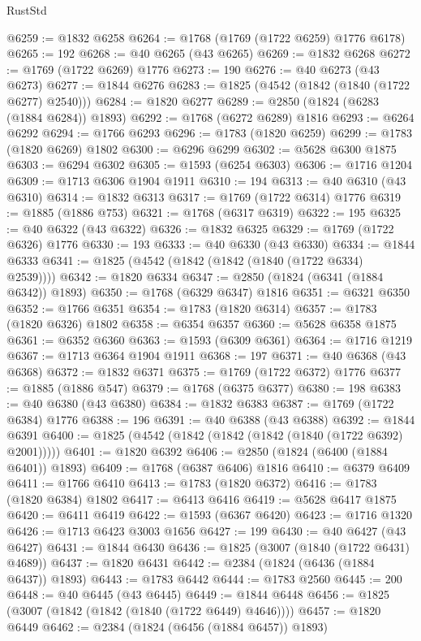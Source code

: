 \begin{lexlean}{RustStd}
\begin{coremodule}
@6259 := @1832 @6258
@6264 := @1768 (@1769 (@1722 @6259) @1776 @6178)
@6265 := 192
@6268 := @40 @6265 (@43 @6265)
@6269 := @1832 @6268
@6272 := @1769 (@1722 @6269) @1776
@6273 := 190
@6276 := @40 @6273 (@43 @6273)
@6277 := @1844 @6276
@6283 := @1825 (@4542 (@1842 (@1840 (@1722 @6277) @2540)))
@6284 := @1820 @6277
@6289 := @2850 (@1824 (@6283 (@1884 @6284)) @1893)
@6292 := @1768 (@6272 @6289) @1816
@6293 := @6264 @6292
@6294 := @1766 @6293
@6296 := @1783 (@1820 @6259)
@6299 := @1783 (@1820 @6269) @1802
@6300 := @6296 @6299
@6302 := @5628 @6300 @1875
@6303 := @6294 @6302
@6305 := @1593 (@6254 @6303)
@6306 := @1716 @1204
@6309 := @1713 @6306 @1904 @1911
@6310 := 194
@6313 := @40 @6310 (@43 @6310)
@6314 := @1832 @6313
@6317 := @1769 (@1722 @6314) @1776
@6319 := @1885 (@1886 @753)
@6321 := @1768 (@6317 @6319)
@6322 := 195
@6325 := @40 @6322 (@43 @6322)
@6326 := @1832 @6325
@6329 := @1769 (@1722 @6326) @1776
@6330 := 193
@6333 := @40 @6330 (@43 @6330)
@6334 := @1844 @6333
@6341 := @1825 (@4542 (@1842 (@1842 (@1840 (@1722 @6334) @2539))))
@6342 := @1820 @6334
@6347 := @2850 (@1824 (@6341 (@1884 @6342)) @1893)
@6350 := @1768 (@6329 @6347) @1816
@6351 := @6321 @6350
@6352 := @1766 @6351
@6354 := @1783 (@1820 @6314)
@6357 := @1783 (@1820 @6326) @1802
@6358 := @6354 @6357
@6360 := @5628 @6358 @1875
@6361 := @6352 @6360
@6363 := @1593 (@6309 @6361)
@6364 := @1716 @1219
@6367 := @1713 @6364 @1904 @1911
@6368 := 197
@6371 := @40 @6368 (@43 @6368)
@6372 := @1832 @6371
@6375 := @1769 (@1722 @6372) @1776
@6377 := @1885 (@1886 @547)
@6379 := @1768 (@6375 @6377)
@6380 := 198
@6383 := @40 @6380 (@43 @6380)
@6384 := @1832 @6383
@6387 := @1769 (@1722 @6384) @1776
@6388 := 196
@6391 := @40 @6388 (@43 @6388)
@6392 := @1844 @6391
@6400 := @1825 (@4542 (@1842 (@1842 (@1842 (@1840 (@1722 @6392) @2001)))))
@6401 := @1820 @6392
@6406 := @2850 (@1824 (@6400 (@1884 @6401)) @1893)
@6409 := @1768 (@6387 @6406) @1816
@6410 := @6379 @6409
@6411 := @1766 @6410
@6413 := @1783 (@1820 @6372)
@6416 := @1783 (@1820 @6384) @1802
@6417 := @6413 @6416
@6419 := @5628 @6417 @1875
@6420 := @6411 @6419
@6422 := @1593 (@6367 @6420)
@6423 := @1716 @1320
@6426 := @1713 @6423 @3003 @1656
@6427 := 199
@6430 := @40 @6427 (@43 @6427)
@6431 := @1844 @6430
@6436 := @1825 (@3007 (@1840 (@1722 @6431) @4689))
@6437 := @1820 @6431
@6442 := @2384 (@1824 (@6436 (@1884 @6437)) @1893)
@6443 := @1783 @6442
@6444 := @1783 @2560
@6445 := 200
@6448 := @40 @6445 (@43 @6445)
@6449 := @1844 @6448
@6456 := @1825 (@3007 (@1842 (@1842 (@1840 (@1722 @6449) @4646))))
@6457 := @1820 @6449
@6462 := @2384 (@1824 (@6456 (@1884 @6457)) @1893)

\end{coremodule}
\end{lexlean}
